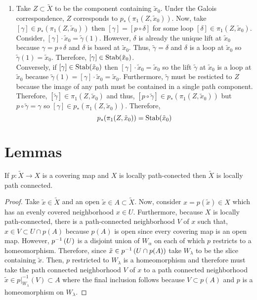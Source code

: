 \documentclass[12pt]{extarticle}
\begin{document}
\begin{enumerate}
\item Take $Z \subset \tilde{X}$ to be the component containing $\tilde{x}_0$. Under the Galois correspondence, $Z$ corresponds to $p_*(\pi_1(Z, \tilde{x}_0))$. Now, take $[\gamma] \in p_*(\pi_1(Z, \tilde{x}_0))$ then $[\gamma] = [p \circ \delta]$ for some loop $[\delta] \in \pi_1(Z, \tilde{x}_0)$. Consider, $[\gamma] \cdot \tilde{x}_0 = \tilde{\gamma}(1)$. However, $\delta$ is already the unique lift at $\tilde{x}_0$ because $\gamma = p \circ \delta$ and $\delta$ is based at $\tilde{x}_0$. Thus, $\tilde{\gamma} = \delta$ and $\delta$ is a loop at $\tilde{x}_0$ so $\tilde{\gamma}(1) = \tilde{x}_0$. Therefore, $[\gamma] \in \mathrm{Stab}(\tilde{x}_0)$. \bigskip \\ 
Conversely, if $[\gamma] \in \mathrm{Stab}(\tilde{x}_0)$ then $[\gamma] \cdot \tilde{x}_0 = \tilde{x}_0$ so the lift $\tilde{\gamma}$ at $\tilde{x}_0$ is a loop at $\tilde{x}_0$ because $\tilde{\gamma}(1) = [\gamma] \cdot \tilde{x}_0 = \tilde{x}_0$. Furthermore, $\tilde{\gamma}$ must be resticted to $Z$ because the image of any path must be contained in a single path component. Therefore, $[\tilde{\gamma}] \in \pi_1(Z, \tilde{x}_0)$ and thus, $[p \circ \tilde{\gamma}] \in p_*(\pi_1(Z, \tilde{x}_0))$ but $p \circ \tilde{\gamma} = \gamma$ so $[\gamma] \in p_*(\pi_1(Z, \tilde{x}_0))$. Therefore,
\[p_*(\pi_1(Z, \tilde{x}_0)) = \mathrm{Stab}(\tilde{x}_0)\]

\end{enumerate}
     
              
\section*{Lemmas}

\begin{lemma} \label{locpathcover}
If $p : \tilde{X} \to X$ is a covering map and $X$ is locally path-conected then $\tilde{X}$ is locally path connected. 
\end{lemma}

\begin{proof}
Take $\tilde{x} \in \tilde{X}$ and an open $\tilde{x} \in A \subset \tilde{X}$. Now, consider $x = p(\tilde{x}) \in X$ which has an evenly covered neighborhood $x \in U$. Furthermore, because $X$ is locally path-connected, there is a path-connected neighborhood $V$ of $x$ such that, $x \in V \subset U \cap p(A)$ because $p(A)$ is open since every covering map is an open map. However, $p^{-1} \left( U \right)$ is a disjoint union of $W_\alpha$ on each of which $p$ restricts to a homeomorphism. Therefore, since $\tilde{x} \in p^{-1} \left( U \cap p(A) \right)$ take $W_\lambda$ to be the slice containing $\tilde{x}$. Then, $p$ restricted to $W_\lambda$ is a homeomorphism and therefore must take the path connected neighborhood $V$ of $x$ to a path connected neighborhood $\tilde{x} \in p|_{W_\lambda}^{-1}(V) \subset A$ where the final inclusion follows because $V \subset p(A)$ and $p$ is a homeomorphism on $W_\lambda$.  
\end{proof}
\end{document}
